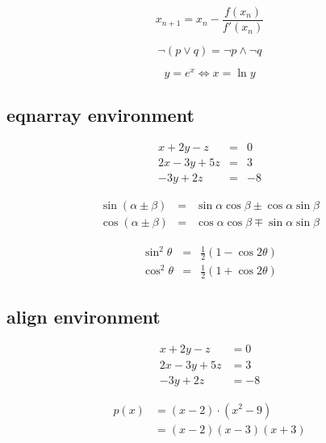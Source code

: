 \documentclass{article}
\begin{document}
\begin{equation}
x_{n+1} = x_n-\frac{f(x_n)}{f'(x_n)}
\end{equation}



\begin{equation}
\lnot (p \lor q) = \lnot p \land \lnot q  \nonumber %
\end{equation}

\begin{equation}
y=e^x\Leftrightarrow x=\ln y
\end{equation}

\subsection{eqnarray environment}


\begin{eqnarray} %
x + 2y -z &=&0\\
2x-3y+5z &=&3\\
-3y+2z &=&-8
\end{eqnarray}

\begin{eqnarray*}
\sin(\alpha\pm\beta) &=& \sin\alpha\cos\beta \pm \cos\alpha\sin\beta\\
\cos(\alpha\pm\beta) &=& \cos\alpha\cos\beta \mp \sin\alpha\sin\beta
\end{eqnarray*}

\begin{eqnarray}
\sin^2 \theta &=& \frac{1}{2}(1-\cos 2\theta)\\
\cos^2\theta &=& \frac{1}{2}(1+\cos 2\theta)
\end{eqnarray}

\subsection{align environment}

\begin{align} %
x + 2y -z &=0\\
2x-3y+5z &=3 \nonumber \\
-3y+2z &=-8
\end{align}

\begin{align*}
p(x)&=(x-2) \cdot (x^2-9) \\
&=(x-2)(x-3)(x+3) 
\end{align*}
\end{document}
